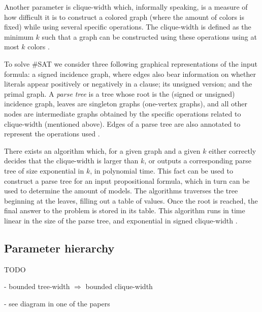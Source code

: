 \documentclass{article}
\begin{document}
Another parameter is clique-width which, informally speaking, is a measure of how difficult it is to construct a colored graph (where the amount of colors is fixed) while using several specific operations.
The clique-width is defined as the minimum $k$ such that a graph can be constructed using these operations using at most $k$ colors \cite{DBLP:journals/dam/FischerMR08}.

To solve \#SAT we consider three following graphical representations of the input formula: a signed incidence graph, where edges also bear information on whether literals appear positively or negatively in a clause; its unsigned version; and the primal graph.
A {\em parse tree} is a tree whose root is the (signed or unsigned) incidence graph, leaves are singleton graphs (one-vertex graphs), and all other nodes are intermediate graphs obtained by the specific operations related to clique-width (mentioned above).
Edges of a parse tree are also annotated to represent the operations used \cite{DBLP:journals/dam/FischerMR08}.

There exists an algorithm which, for a given graph and a given $k$ either correctly decides that the clique-width is larger than $k$, or outputs a corresponding parse tree of size exponential in $k$, in polynomial time.
This fact can be used to construct a parse tree for an input propositional formula, which in turn can be used to determine the amount of models.
The algorithms traverses the tree beginning at the leaves, filling out a table of values.
Once the root is reached, the final answer to the problem is stored in its table.
This algorithm runs in time linear in the size of the parse tree, and exponential in signed clique-width \cite{DBLP:journals/dam/FischerMR08}.

\subsection{Parameter hierarchy}

TODO

- bounded tree-width $\Rightarrow$ bounded clique-width

- see diagram in one of the papers
 



\end{document}
